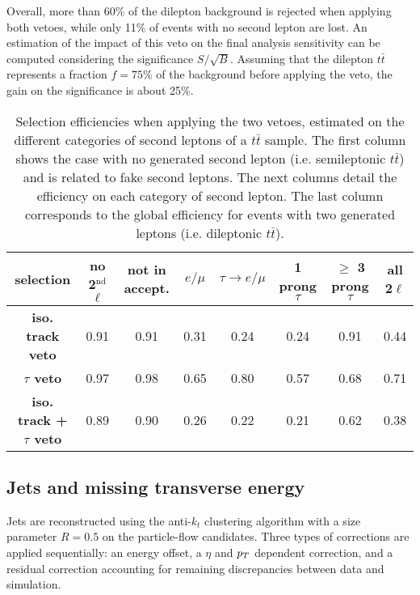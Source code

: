     Overall, more than 60\% of the dilepton background is rejected when applying
    both vetoes, while only 11\% of events with no second lepton are lost. An
    estimation of the impact of this veto on the final analysis sensitivity can
    be computed considering the significance $S/\sqrt{B}$. Assuming that the
    dilepton $t\bar{t}$ represents a fraction $f = 75\%$ of the background
    before applying the veto, the gain on the significance is about 25\%.

    \begin{table}
    \hspace*{-1.2cm}
    \begin{tabular}{|c|c|ccccc|c|}
        \hline
        \textbf{selection}                  & no 2$^\text{nd}$ $\ell$ & not in accept. & $e/\mu$ & $\tau \rightarrow e/\mu$ & 1 prong $\tau $ & $\geq$ 3 prong $\tau$ & all 2$\ell$ \\
        \hline
        \textbf{iso. track veto}            & 0.91                    & 0.91  & 0.31  & 0.24  & 0.24  & 0.91  & 0.44  \\
        \textbf{$\tau$ veto}                & 0.97                    & 0.98  & 0.65  & 0.80  & 0.57  & 0.68  & 0.71  \\
        \hline
        \textbf{iso. track + $\tau$ veto}   & 0.89                    & 0.90  & 0.26  & 0.22  & 0.21  & 0.62  & 0.38 \\
        \hline
    \end{tabular}
        \caption{Selection efficiencies when applying the two vetoes, estimated
        on the different categories of second leptons of a $t\bar{t}$ sample.
        The first column shows the case with no generated second lepton (i.e.
        semileptonic $t\bar{t}$) and is related to fake second leptons. The next
        columns detail the efficiency on each category of second lepton. The
        last column corresponds to the global efficiency for events with two
        generated leptons (i.e. dileptonic $t\bar{t}$).}
        \label{tab:secondLeptonVetoPerformances}
    \end{table}

    \subsection{Jets and missing transverse energy \label{sec:analysisJetMET}}

   Jets are reconstructed using the anti-$k_t$ clustering algorithm with a size
   parameter $R = 0.5$ on the particle-flow candidates. Three types of
   corrections are applied sequentially: an energy offset, a $\eta$ and $p_T$
   dependent correction, and a residual correction accounting for remaining
   discrepancies between data and simulation.

